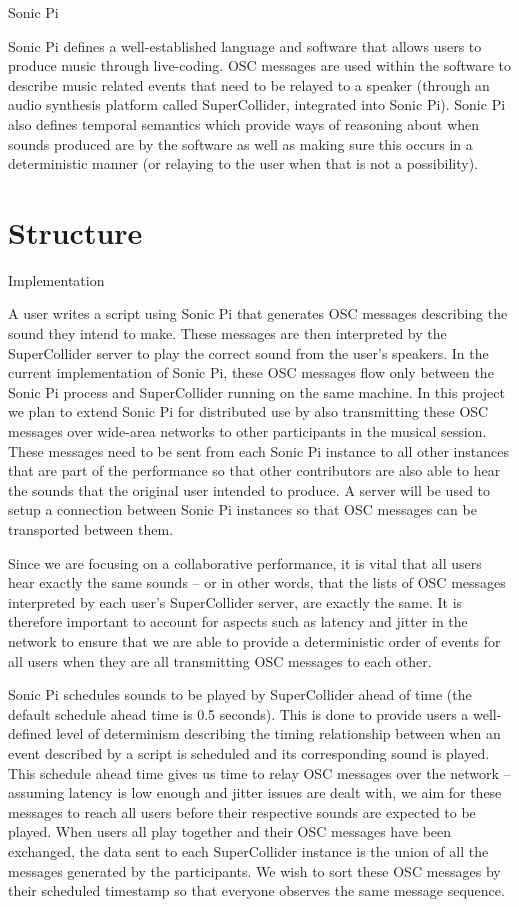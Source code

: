 \documentclass[12pt,a4paper,twoside]{article}
\begin{document}
\Large
Sonic Pi

\normalsize
Sonic Pi defines a well-established language and software that allows users to produce music through live-coding. OSC messages are used within the software to describe music related events that need to be relayed to a speaker (through an audio synthesis platform called SuperCollider, integrated into Sonic Pi). Sonic Pi also defines temporal semantics which provide ways of reasoning about when sounds produced are by the software as well as making sure this occurs in a deterministic manner (or relaying to the user when that is not a possibility).


\section*{Structure}

\large
Implementation

\normalsize
A user writes a script using Sonic Pi that generates OSC messages describing the sound they intend to make. These messages are then interpreted by the SuperCollider server to play the correct sound from the user's speakers. In the current implementation of Sonic Pi, these OSC messages flow only between the Sonic Pi process and SuperCollider running on the same machine. In this project we plan to extend Sonic Pi for distributed use by also transmitting these OSC messages over wide-area networks to other participants in the musical session. These messages need to be sent from each Sonic Pi instance to all other instances that are part of the performance so that other contributors are also able to hear the sounds that the original user intended to produce. A server will be used to setup a connection between Sonic Pi instances so that OSC messages can be transported between them.

Since we are focusing on a collaborative performance, it is vital that all users hear exactly the same sounds -- or in other words, that the lists of OSC messages interpreted by each user's SuperCollider server, are exactly the same. It is therefore important to account for aspects such as latency and jitter in the network to ensure that we are able to provide a deterministic order of events for all users when they are all transmitting OSC messages to each other.

Sonic Pi schedules sounds to be played by SuperCollider ahead of time (the default schedule ahead time is 0.5 seconds). This is done to provide users a well-defined level of determinism describing the timing relationship between when an event described by a script is scheduled and its corresponding sound is played. This schedule ahead time gives us time to relay OSC messages over the network -- assuming latency is low enough and jitter issues are dealt with, we aim for these messages to reach all users before their respective sounds are expected to be played. When users all play together and their OSC messages have been exchanged, the data sent to each SuperCollider instance is the union of all the messages generated by the participants. We wish to sort these OSC messages by their scheduled timestamp so that everyone observes the same message sequence.
\end{document}
